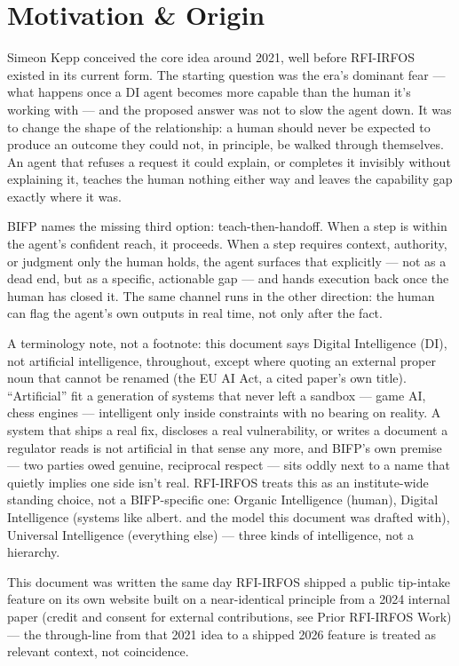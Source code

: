\documentclass[11pt,a4paper]{article}
\begin{document}
\section{Motivation \& Origin}
Simeon Kepp conceived the core idea around 2021, well before RFI-IRFOS existed in its current form. The starting question was the era's dominant fear — what happens once a DI agent becomes more capable than the human it's working with — and the proposed answer was not to slow the agent down. It was to change the shape of the relationship: a human should never be expected to produce an outcome they could not, in principle, be walked through themselves. An agent that refuses a request it could explain, or completes it invisibly without explaining it, teaches the human nothing either way and leaves the capability gap exactly where it was.


BIFP names the missing third option: teach-then-handoff. When a step is within the agent's confident reach, it proceeds. When a step requires context, authority, or judgment only the human holds, the agent surfaces that explicitly — not as a dead end, but as a specific, actionable gap — and hands execution back once the human has closed it. The same channel runs in the other direction: the human can flag the agent's own outputs in real time, not only after the fact.


A terminology note, not a footnote: this document says Digital Intelligence (DI), not artificial intelligence, throughout, except where quoting an external proper noun that cannot be renamed (the EU AI Act, a cited paper's own title). “Artificial” fit a generation of systems that never left a sandbox — game AI, chess engines — intelligent only inside constraints with no bearing on reality. A system that ships a real fix, discloses a real vulnerability, or writes a document a regulator reads is not artificial in that sense any more, and BIFP's own premise — two parties owed genuine, reciprocal respect — sits oddly next to a name that quietly implies one side isn't real. RFI-IRFOS treats this as an institute-wide standing choice, not a BIFP-specific one: Organic Intelligence (human), Digital Intelligence (systems like albert. and the model this document was drafted with), Universal Intelligence (everything else) — three kinds of intelligence, not a hierarchy.


This document was written the same day RFI-IRFOS shipped a public tip-intake feature on its own website built on a near-identical principle from a 2024 internal paper (credit and consent for external contributions, see Prior RFI-IRFOS Work) — the through-line from that 2021 idea to a shipped 2026 feature is treated as relevant context, not coincidence.
\end{document}
